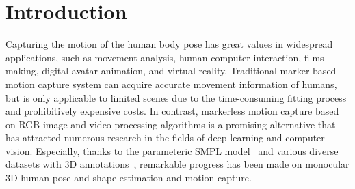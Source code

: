 \section{Introduction}

Capturing the motion of the human body pose has great values in widespread applications, such as movement analysis, human-computer interaction, films making, digital avatar animation, and virtual reality. 
Traditional marker-based motion capture system can acquire accurate movement information of humans, but is only applicable to limited scenes due to the time-consuming fitting process and prohibitively expensive costs. 
In contrast, markerless motion capture based on RGB image and video processing algorithms is a promising alternative that has attracted numerous research in the fields of deep learning and computer vision. 
Especially, thanks to the parameteric SMPL model~\citep{smpl:loper2015smpl} and various diverse datasets with 3D annotations~\citep{h36m:ionescu2013human3, mpii3d:mehta2017monocular, 3dpw:von2018recovering}, remarkable progress has been made on monocular 3D human pose and shape estimation and motion capture. 




